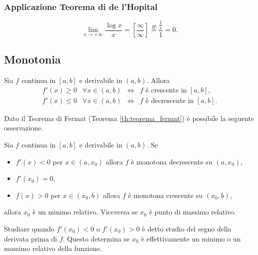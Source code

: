 \subsubsection{Applicazione Teorema di de l'Hopital}
\begin{example}
    \begin{equation*}
        \lim_{x\rightarrow+\infty}\frac{\log x}{x}=\left[\frac{\infty}{\infty}\right]\overset{H}{=}\frac{\frac{1}{x}}{1}=0.
    \end{equation*}
\end{example}

\subsection{Monotonia}

\begin{theorem}
    Sia $f$ continua in $[a,b]$ e derivabile in $(a,b)$. Allora
    \begin{equation*}
        \begin{matrix}
            f'(x)\geq 0 &\forall x\in(a,b)& \iff & f \text{ è crescente in } [a,b],\\
            f'(x)\leq 0 &\forall x\in(a,b)& \iff & f \text{ è decrescente in } [a,b].
        \end{matrix}
    \end{equation*}
\end{theorem}

Dato il Teorema di Fermat (Teorema \ref{th:teorema_fermat}) è possibile la seguente osservazione.

\begin{remark}\label{rem:minimo_relativo}
    Sia $f$ continua in $[a,b]$ e derivabile in $(a,b)$. Se
    \begin{itemize}
        \item $f'(x)<0$ per $x\in(a,x_0)$ allora $f$ è monotona decrescente su $(a,x_0)$,
        \item $f'(x_0)=0$,
        \item $f(x)>0$ per $x\in(x_0,b)$ allora $f$ è monotona crescente su $(x_0,b)$,
    \end{itemize}
    allora $x_0$ è un minimo relativo. Viceversa se $x_0$ è punto di massimo relativo.
\end{remark}

Studiare quando $f'(x_0)<0$ o $f'(x_0)>0$ è detto studio del segno della derivata prima di $f$. Questo determina se $x_0$ è effettivamente un minimo o un massimo relativo della funzione.

